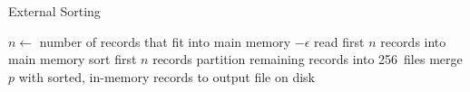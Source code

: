 \documentclass[a1paper,portrait,american,fontscale=.4]{baposter}
\begin{document}
\begin{algorithm}
    \caption{External Sorting}
    \begin{algorithmic}
        \State $n \gets$ number of records that fit into main memory $- \epsilon$
        \State read first $n$ records into main memory
        \State sort first $n$ records 
        \State partition remaining records into 256~files
            \State merge $p$ with sorted, in-memory records to output file on disk
        \EndFor
    \end{algorithmic}
\end{algorithm}
\end{document}
